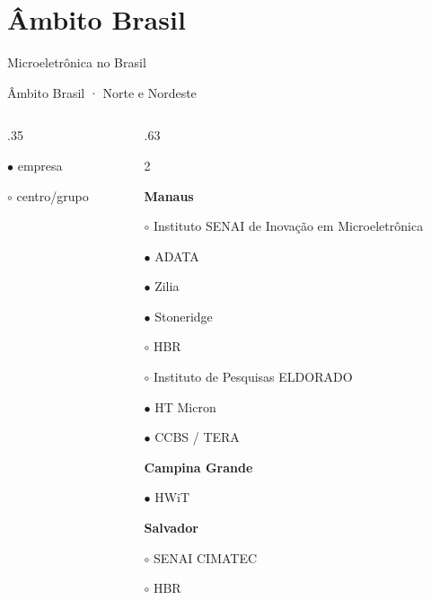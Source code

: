 \section{Âmbito Brasil}
\begin{frame}{Microeletrônica no Brasil}
\creditoBrasil
\end{frame}
\begin{frame}{Âmbito Brasil · Norte e Nordeste}
\begin{columns}[T,onlytextwidth]
\begin{column}{.35\textwidth}
{\tiny $\bullet$ empresa\par $\circ$ centro/grupo}
\end{column}
\begin{column}{.63\textwidth}
\footnotesize\setlength{\columnsep}{3mm}\begin{multicols}{2}\raggedright
\textcolor{blue_theme}{\textbf{Manaus}}\par\smallskip
\noindent\parbox{\linewidth}{$\circ$ Instituto SENAI de Inovação em Microeletrônica}\par
\noindent\parbox{\linewidth}{$\bullet$ ADATA}\par
\noindent\parbox{\linewidth}{$\bullet$ Zilia}\par
\noindent\parbox{\linewidth}{$\bullet$ Stoneridge}\par
\noindent\parbox{\linewidth}{$\circ$ HBR}\par
\noindent\parbox{\linewidth}{$\circ$ Instituto de Pesquisas ELDORADO}\par
\noindent\parbox{\linewidth}{$\bullet$ HT Micron}\par
\noindent\parbox{\linewidth}{$\bullet$ CCBS / TERA}\par
\medskip
\textcolor{blue_theme}{\textbf{Campina Grande}}\par\smallskip
\noindent\parbox{\linewidth}{$\bullet$ HWiT}\par
\medskip
\textcolor{blue_theme}{\textbf{Salvador}}\par\smallskip
\noindent\parbox{\linewidth}{$\circ$ SENAI CIMATEC}\par
\noindent\parbox{\linewidth}{$\circ$ HBR}\par
\medskip
\end{multicols}
\end{column}
\end{columns}
\creditoBrasil
\end{frame}
